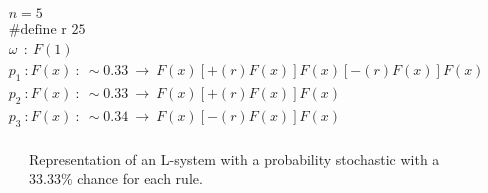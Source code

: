 \begin{flushleft}
\vspace{5mm} 


\begin{equation} \label{stochastic example}
\begin{aligned}
	&n=5\\
	&\text{\#define r 25}\\
	&\omega~~ :~ F(1)\\
	&p_1~ :  F(x)~ :~ \sim 0.33 ~ \rightarrow~ F(x)[+(r)F(x)]F(x)[-(r)F(x)]F(x)\\
	&p_2~ :  F(x)~ :~ \sim 0.33 ~ \rightarrow~ F(x)[+(r)F(x)]F(x)\\
	&p_3~ :  F(x)~ :~ \sim 0.34 ~ \rightarrow~ F(x)[-(r)F(x)]F(x)\\
\end{aligned}
\end{equation}

\begin{figure}[htbp]
	{\centering
		\vspace{7px}
		\setlength{\fboxrule}{1pt}
		\caption{Representation of an L-system with a probability stochastic with a 33.33\% chance for each rule.}
	}
\end{figure}

\FloatBarrier


\end{flushleft}






